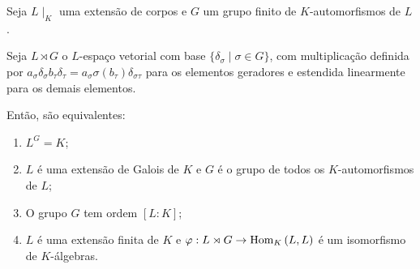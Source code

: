 \begin{teo}\label{teo:galoisgeneralizavel}
Seja $L\mid_K$ uma extensão de corpos e $G$ um grupo finito de $K$-automorfismos de $L$.

Seja $L\rtimes G$ o $L$-espaço vetorial com base $\{\delta_\sigma\mid \sigma \in G\}$, com multiplicação definida por $a_\sigma \delta_\sigma b_\tau \delta_\tau = a_\sigma \sigma(b_\tau) \delta_{\sigma\tau}$ para os elementos geradores e estendida linearmente para os demais elementos.

Então, são equivalentes:
\begin{enumerate}
    \item $L^G = K$;
    \item $L$ é uma extensão de Galois de $K$ e $G$ é o grupo de todos os $K$-automorfismos de $L$;
    \item O grupo $G$ tem ordem $[L:K]$;
    \item $L$ é uma extensão finita de $K$ e $\varphi: L\rtimes G \rightarrow \textrm{Hom}_{K}\left( L,L \right)$ é um isomorfismo de $K$-álgebras.
\end{enumerate}
\end{teo}


